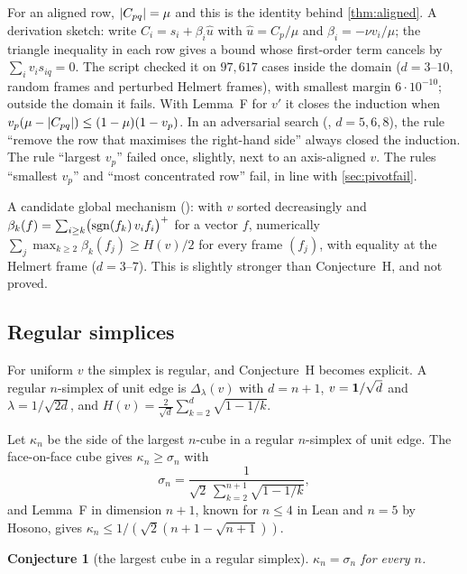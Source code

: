 \documentclass[11pt,a4paper]{article}
\newtheorem{conjecture}[theorem]{Conjecture}
\begin{document}
For an aligned row, $\lvert C_{pq}\rvert=\mu$ and this is the identity behind \cref{thm:aligned}. A derivation sketch: write $C_i=s_i+\beta_i\hat u$ with $\hat u=C_p/\mu$ and $\beta_i=-\nu v_i/\mu$; the triangle inequality in each row gives a bound whose first-order term cancels by $\sum_iv_is_{iq}=0$. The script  checked it on $97{,}617$ cases inside the domain ($d=3$--$10$, random frames and perturbed Helmert frames), with smallest margin $6\cdot10^{-10}$; outside the domain it fails. With Lemma~F for $v'$ it closes the induction when $v_p(\mu-\lvert C_{pq}\rvert)\le(1-\mu)(1-v_p)$. In an adversarial search (, $d=5,6,8$), the rule ``remove the row that maximises the right-hand side'' always closed the induction. The rule ``largest $v_p$'' failed once, slightly, next to an axis-aligned $v$. The rules ``smallest $v_p$'' and ``most concentrated row'' fail, in line with \cref{sec:pivotfail}.

A candidate global mechanism (): with $v$ sorted decreasingly and $\beta_k(f)=\sum_{i\ge k}\bigl(\operatorname{sgn}(f_k)\,v_if_i\bigr)^+$ for a vector $f$, numerically $\sum_j\max_{k\ge2}\beta_k(f_j)\ge H(v)/2$ for every frame $(f_j)$, with equality at the Helmert frame ($d=3$--$7$). This is slightly stronger than Conjecture~H, and not proved.

\subsection{Regular simplices}\label{sec:regular}
For uniform $v$ the simplex is regular, and Conjecture~H becomes explicit. A regular $n$-simplex of unit edge is $\Delta_\lambda(v)$ with $d=n+1$, $v=\mathbf 1/\sqrt d$ and $\lambda=1/\sqrt{2d}$, and $H(v)=\frac2{\sqrt d}\sum_{k=2}^{d}\sqrt{1-1/k}$.

Let $\kappa_n$ be the side of the largest $n$-cube in a regular $n$-simplex of unit edge. The face-on-face cube gives $\kappa_n\ge\sigma_n$ with
\[
\sigma_n=\frac{1}{\sqrt2\,\sum_{k=2}^{n+1}\sqrt{1-1/k}},
\]
and Lemma~F in dimension $n+1$, known for $n\le4$ in Lean and $n=5$ by Hosono, gives $\kappa_n\le1/(\sqrt2(n+1-\sqrt{n+1}))$.

\begin{conjecture}[the largest cube in a regular simplex]\label{conj:regular}
$\kappa_n=\sigma_n$ for every $n$.
\end{conjecture}

\begin{table}[t]
\centering\small

\caption{The largest $n$-cube in a regular $n$-simplex of unit edge: the side $\sigma_n$ of the face-on-face cube (a lower bound for $\kappa_n$, and equal to it by \cref{conj:regular}), the upper bound from Lemma~F (\cref{cor:simplex}), and the volume bound $\vol(\Delta)^{1/n}$. $\kappa_n=\sigma_n$ is classical for $n=2$ and Croft's theorem for $n=3$. For $n\le\frameslastn$ no frame found numerically beats $\sigma_n$ (\cref{sec:numH}).}
\label{tab:regular}
\end{table}
\end{document}

